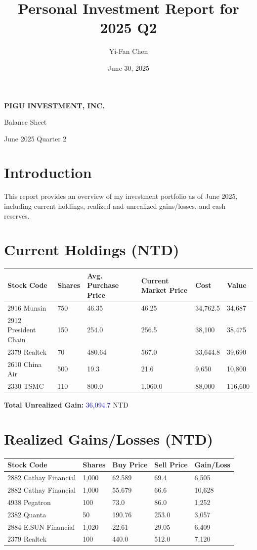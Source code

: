 \documentclass[a4paper,12pt]{article}
\title{\textbf{Personal Investment Report for 2025 Q2}}
\author{Yi-Fan Chen}
\date{June 30, 2025}
\begin{document}
\begin{titlepage}
    \centering
    \vspace*{\fill}
    {\Huge \textbf{PIGU INVESTMENT, INC.} \par}
    \vspace{1.5cm}
    {\LARGE Balance Sheet \par}
    \vspace{2cm}
    {\Large June 2025 Quarter 2 \par}
    \vspace*{\fill}
\end{titlepage}


\section{Introduction}
This report provides an overview of my investment portfolio as of June 2025, including current holdings, realized and unrealized gains/losses, and cash reserves.

\section{Current Holdings (NTD)}
\begin{longtable}{llllll}
    \toprule
    Stock Code & Shares & Avg. Purchase Price & Current Market Price & Cost & Value \\
    \midrule
    2916 Munsin       & 750  & 46.35 & 46.25 & 34,762.5 & 34,687 \\
    2912 President Chain & 150 & 254.0  & 256.5  & 38,100  & 38,475 \\
    2379 Realtek      & 70   & 480.64 & 567.0 & 33,644.8 & 39,690 \\
    2610 China Air    & 500  & 19.3   & 21.6  & 9,650   & 10,800 \\
    2330 TSMC         & 110  & 800.0 & 1,060.0 & 88,000  & 116,600 \\
    \bottomrule
\end{longtable}
\textbf{Total Unrealized Gain:} \textcolor{blue}{36,094.7} NTD

\section{Realized Gains/Losses (NTD)}
\begin{longtable}{lllll}
    \toprule
    Stock Code & Shares & Buy Price & Sell Price & Gain/Loss \\
    \midrule
    2882 Cathay Financial & 1,000 & 62.589 & 69.4 & 6,505 \\
    2882 Cathay Financial & 1,000 & 55.679 & 66.6 & 10,628 \\
    4938 Pegatron & 100 & 73.0 & 86.0 & 1,252 \\
    2382 Quanta & 50 & 190.76 & 253.0 & 3,057 \\
    2884 E.SUN Financial & 1,020 & 22.61 & 29.05 & 6,409 \\
    2379 Realtek & 100 & 440.0 & 512.0 & 7,120 \\
    \bottomrule
\end{longtable}
\end{document}
